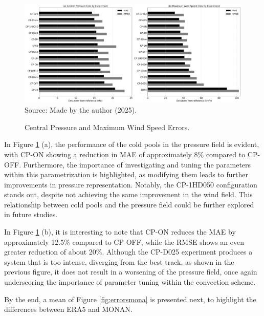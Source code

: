 \begin{figure}[!ht]
	\centering
	\caption{Central Pressure and Maximum Wind Speed Errors.} %
	\includegraphics[width=\textwidth]{docs/figuras/chapter5/panel_mae_rmse_mslp_wspd_FINAL.png} 
	\vspace{0.5em}
	Source: Made by the author (2025).  %
	\label{fig:errors} %
\end{figure}

In Figure \ref{fig:errors} (a), the performance of the cold pools in the pressure field is evident, with CP-ON showing a reduction in MAE of approximately 8\% compared to CP-OFF. Furthermore, the importance of investigating and tuning the parameters within this parametrization is highlighted, as modifying them leads to further improvements in pressure representation. Notably, the CP-1HD050 configuration stands out, despite not achieving the same improvement in the wind field. This relationship between cold pools and the pressure field could be further explored in future studies.

In Figure \ref{fig:errors} (b), it is interesting to note that CP-ON reduces the MAE by approximately 12.5\% compared to CP-OFF, while the RMSE shows an even greater reduction of about 20\%. Although the CP-D025 experiment produces a system that is too intense, diverging from the best track, as shown in the previous figure, it does not result in a worsening of the pressure field, once again underscoring the importance of parameter tuning within the convection scheme.

By the end, a mean of Figure \ref{fig:errorsmona} is presented next, to highlight the differences between ERA5 and MONAN.

